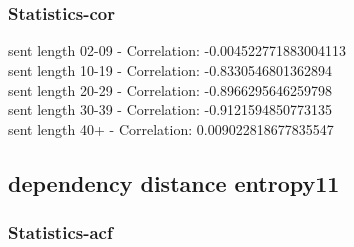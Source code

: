 \documentclass{article}%
\begin{document}
\begin{figure}[ht]%
\centering%
\setlength{\abovecaptionskip}{-35pt}%
%
%
\\%
%
%
\\%
%
\end{figure}

%
\newpage%
\subsubsection{Statistics{-}cor}%
\label{ssubsec:Statistics{-}cor}%
\noindent%
sent length 02-09 - Correlation: -0.004522771883004113\\%
sent length 10-19 - Correlation: -0.8330546801362894\\%
sent length 20-29 - Correlation: -0.8966295646259798\\%
sent length 30-39 - Correlation: -0.9121594850773135\\%
sent length 40+ - Correlation: 0.009022818677835547\\

%
\newpage

%
\subsection{dependency distance entropy11}%
\label{subsec:dependencydistanceentropy11}%
\subsubsection{Statistics{-}acf}%
\label{ssubsec:Statistics{-}acf}%
\end{document}

